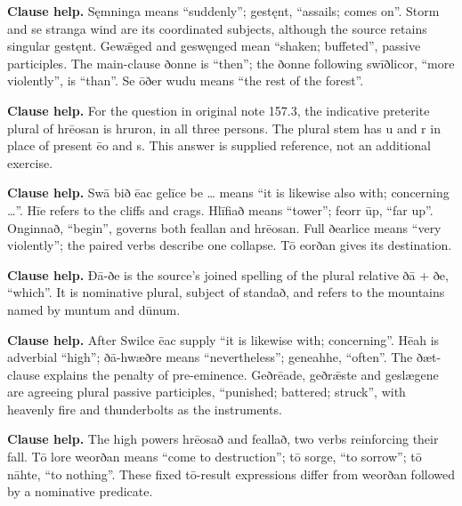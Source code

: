 \textbf{Clause help.} Sęmninga means “suddenly”; gestęnt, “assails; comes on”. Storm and se stranga wind are its coordinated subjects, although the source retains singular gestęnt. Gewǣged and geswęnged mean “shaken; buffeted”, passive participles. The main-clause ðonne is “then”; the ðonne following swīðlicor, “more violently”, is “than”. Se ōðer wudu means “the rest of the forest”.

\textbf{Clause help.} For the question in original note 157.3, the indicative preterite plural of hrēosan is hruron, in all three persons. The plural stem has u and r in place of present ēo and s. This answer is supplied reference, not an additional exercise.

\textbf{Clause help.} Swā bið ēac gelīce be … means “it is likewise also with; concerning …”. Hīe refers to the cliffs and crags. Hlīfiað means “tower”; feorr ūp, “far up”. Onginnað, “begin”, governs both feallan and hrēosan. Full ðearlice means “very violently”; the paired verbs describe one collapse. Tō eorðan gives its destination.

\textbf{Clause help.} Ðā-ðe is the source’s joined spelling of the plural relative ðā + ðe, “which”. It is nominative plural, subject of standað, and refers to the mountains named by muntum and dūnum.

\textbf{Clause help.} After Swilce ēac supply “it is likewise with; concerning”. Hēah is adverbial “high”; ðā-hwæðre means “nevertheless”; geneahhe, “often”. The ðæt-clause explains the penalty of pre-eminence. Geðrēade, geðrǣste and geslægene are agreeing plural passive participles, “punished; battered; struck”, with heavenly fire and thunderbolts as the instruments.

\textbf{Clause help.} The high powers hrēosað and feallað, two verbs reinforcing their fall. Tō lore weorðan means “come to destruction”; tō sorge, “to sorrow”; tō nāhte, “to nothing”. These fixed tō-result expressions differ from weorðan followed by a nominative predicate.

